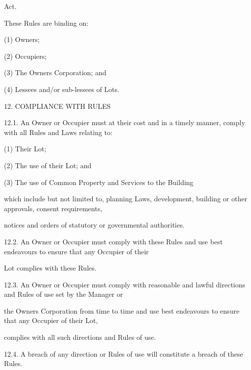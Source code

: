 \documentclass{article}
\begin{document}
{\fontsize{10.02}{1}Act. }

{\fontsize{10.02}{1}These Rules are binding on: }

{\fontsize{9.962}{1}(1) Owners; }

{\fontsize{9.962}{1}(2) Occupiers; }

{\fontsize{9.962}{1}(3) The Owners Corporation; and }

{\fontsize{9.962}{1}(4) Lessees and/or sub-lessees of Lots. }



{\fontsize{9.99}{1}12. COMPLIANCE WITH RULES }

{\fontsize{9.99}{1}12.1. An Owner or Occupier must at their cost and in a timely manner, comply with all Rules and Laws relating to: }

{\fontsize{9.962}{1}(1) Their Lot; }

{\fontsize{9.962}{1}(2) The use of their Lot; and }

{\fontsize{9.962}{1}(3) The use of Common Property and Services to the Building }

{\fontsize{10.02}{1}which include but not limited to, planning Laws, development, building or other approvals, consent requirements, }

{\fontsize{10.02}{1}notices and orders of statutory or governmental authorities. }

{\fontsize{9.99}{1}12.2. An Owner or Occupier must comply with these Rules and use best endeavours to ensure that any Occupier of their }

{\fontsize{10.02}{1}Lot complies with these Rules. }

{\fontsize{9.99}{1}12.3. An Owner or Occupier must comply with reasonable and lawful directions and Rules of use set by the Manager or }

{\fontsize{10.02}{1}the Owners Corporation from time to time and use best endeavours to ensure that any Occupier of their Lot, }

{\fontsize{10.02}{1}complies with all such directions and Rules of use. }

\newpage


















{\fontsize{9.99}{1}12.4. A breach of any direction or Rules of use will constitute a breach of these Rules. }
\end{document}
